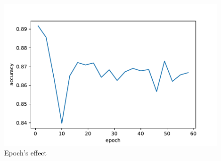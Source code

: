 \documentclass[11pt]{scrartcl}
\begin{document}
\begin{itemize}
	\begin{figure}[H]
	\centering
	\includegraphics[width=0.7\linewidth]{fig/epoch.pdf}
	\caption{Epoch's effect}
	\label{epoch}
\end{figure}
\end{itemize}
\end{document}
